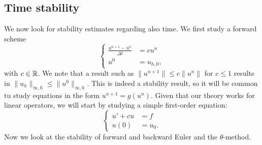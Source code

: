 \subsection{Time stability}
We now look for stability estimates regarding also time. We first study a forward scheme 
\begin{equation}
    \begin{cases}
        \displaystyle\frac{u^{n+1}-u^n}{\Delta t} &= cu^n\\
        u^0&= u_{h,0},
    \end{cases}
\end{equation}
with $c\in \mathbb{R}$. We note that a result such as $\|u^{n+1}\|\leq c\|u^n\|$ for $c\leq 1$ results in $\|u_h\|_{\infty, h} \leq \|u^0\|_{\infty, h}$. This is indeed a stability result, so it will be common tu study equations in the form $u^{n+1} = g(u^n)$. Given that our theory works for linear operators, we will start by studying a simple first-order equation:
\begin{equation}
    \begin{cases}
        u'+cu &= f\\
        u(0) &= u_0.
    \end{cases}
\end{equation}
Now we look at the stability of forward and backward Euler and the $\theta$-method. 
